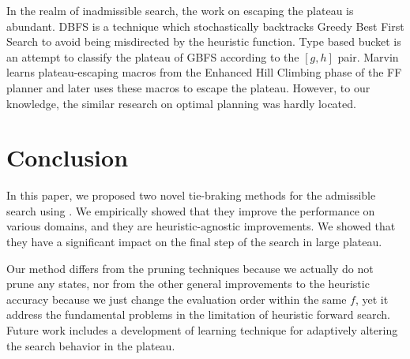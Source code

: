 In the realm of inadmissible search, the work on escaping the plateau is
abundant. DBFS \cite{imai2011novel} is a technique which stochastically
backtracks Greedy Best First Search to avoid being misdirected by the
heuristic function. Type based bucket \cite{xie14type} is an attempt to
classify the plateau of GBFS according to the $[g,h]$ pair.
Marvin \cite{Coles07} learns plateau-escaping macros from the Enhanced
Hill Climbing phase of the FF planner \cite{Hoffmann01} and later uses
these macros to escape the plateau.  However, to our knowledge, the
similar research on optimal planning was hardly located.

\section{Conclusion}

In this paper, we proposed two novel tie-braking methods for the admissible search using \astar. We empirically showed that they improve the performance on various domains, and they are heuristic-agnostic improvements. We showed that they have a significant impact on the final step of the search in large plateau.

Our method differs from the pruning techniques because we actually
do not prune any states, nor from the other general improvements to the
heuristic accuracy because we just change the evaluation order within the
same $f$, yet it address the fundamental problems in the limitation of
heuristic forward search.  Future work includes a development of learning
technique for adaptively altering the search behavior in the plateau.



